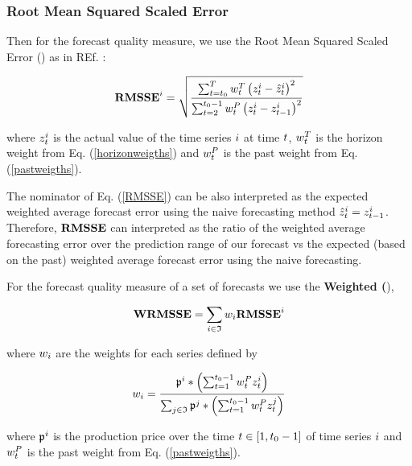 \documentclass[11pt,headings=small]{scrartcl}
\begin{document}
\subsubsection{Root Mean Squared Scaled Error}
\label{subsubsection:RootMeanSquaredScaledError}

Then for the forecast quality measure, we use the Root Mean Squared Scaled Error (\RMSSE) as in REf. \cite{M5Competition}:

\begin{equation}\label{RMSSE}
\textbf{RMSSE}^{i} =  \sqrt{\frac{\sum_{t=t_{0}}^{T} w^T_t \left(z^{i}_{t} - \hat{z}^{i}_{t} \right)^{2} }{\sum_{t=2}^{t_{0} - 1}w^P_t\left(z^{i}_{t} - z^{i}_{t-1} \right)^{2}}}
\end{equation}

where $z^{i}_{t}$ is the actual value of the time series $i$ at time $t$, $w^T_t$ is the horizon weight from Eq. (\ref{horizonweigths}) and $w^P_t$ is the past weight from Eq. (\ref{pastweigths}). 

The nominator of Eq. (\ref{RMSSE}) can be also interpreted as the expected weighted average forecast error using the naive forecasting method $\hat{z}^{i}_{t} = z^{i}_{t-1}$. Therefore, $\textbf{RMSSE}$ can interpreted as the ratio of the weighted average forecasting error over the prediction range of our forecast vs the expected (based on the past) weighted average forecast error using the naive forecasting.

For the forecast quality measure of a set of forecasts we use the \textbf{Weighted \RMSSE(\WRMSSE}),

\begin{equation}\label{WRMSSE}
\textbf{WRMSSE} = \sum_{i\in\frak{I}} w_{i} \textbf{RMSSE}^{i} 
\end{equation}

where $w_{i}$ are the weights for each series defined by 

\begin{equation}\label{fcqualityweight}
w_{i} = \frac{\frak{p}^{i} * \left(\sum_{t=1}^{t_{0}-1}w^P_tz^{i}_{t}\right)}{
	\sum_{j\in\frak{I}}\frak{p}^{j} * \left(\sum_{t=1}^{t_{0}-1}w^P_tz_{t}^{j}\right)}
\end{equation}

where $\frak{p}^{i}$ is the production price over the time $t\in[1,t_{0}-1]$ of time series $i$ and $w^P_t$ is the past weight from Eq. (\ref{pastweigths}).
\end{document}
